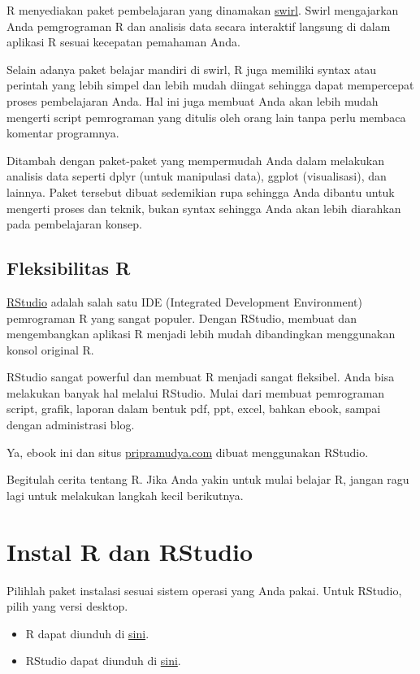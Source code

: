 \documentclass[openany]{book}
\providecommand{\tightlist}{%
  \setlength{\itemsep}{0pt}\setlength{\parskip}{0pt}}
\begin{document}
R menyediakan paket pembelajaran yang dinamakan
\href{https://swirlstats.com/}{swirl}. Swirl mengajarkan Anda
pemgrograman R dan analisis data secara interaktif langsung di dalam
aplikasi R sesuai kecepatan pemahaman Anda.

Selain adanya paket belajar mandiri di swirl, R juga memiliki syntax
atau perintah yang lebih simpel dan lebih mudah diingat sehingga dapat
mempercepat proses pembelajaran Anda. Hal ini juga membuat Anda akan
lebih mudah mengerti script pemrograman yang ditulis oleh orang lain
tanpa perlu membaca komentar programnya.

Ditambah dengan paket-paket yang mempermudah Anda dalam melakukan
analisis data seperti dplyr (untuk manipulasi data), ggplot
(visualisasi), dan lainnya. Paket tersebut dibuat sedemikian rupa
sehingga Anda dibantu untuk mengerti proses dan teknik, bukan syntax
sehingga Anda akan lebih diarahkan pada pembelajaran konsep.

\subsection{Fleksibilitas R}\label{fleksibilitas-r}

\href{https://www.rstudio.com/}{RStudio} adalah salah satu IDE
(Integrated Development Environment) pemrograman R yang sangat populer.
Dengan RStudio, membuat dan mengembangkan aplikasi R menjadi lebih mudah
dibandingkan menggunakan konsol original R.

RStudio sangat powerful dan membuat R menjadi sangat fleksibel. Anda
bisa melakukan banyak hal melalui RStudio. Mulai dari membuat
pemrograman script, grafik, laporan dalam bentuk pdf, ppt, excel, bahkan
ebook, sampai dengan administrasi blog.

Ya, ebook ini dan situs \url{pripramudya.com} dibuat menggunakan
RStudio.

Begitulah cerita tentang R. Jika Anda yakin untuk mulai belajar R,
jangan ragu lagi untuk melakukan langkah kecil berikutnya.

\section{Instal R dan RStudio}\label{instal-r-dan-rstudio}

Pilihlah paket instalasi sesuai sistem operasi yang Anda pakai. Untuk
RStudio, pilih yang versi desktop.

\begin{itemize}
\tightlist
\item
  R dapat diunduh di \href{https://repo.bppt.go.id/cran/}{sini}.
\item
  RStudio dapat diunduh di
  \href{https://www.rstudio.com/products/rstudio/download/}{sini}.
\end{itemize}
\end{document}
